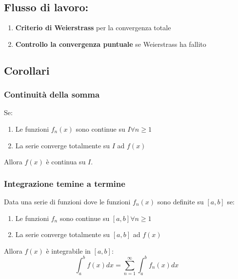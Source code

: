 \documentclass[10pt, a4paper]{article}
\begin{document}
    \subsection{Flusso di lavoro:}
    \begin{enumerate}
        \item \textbf{Criterio di Weierstrass} per la convergenza totale
        \item \textbf{Controllo la convergenza puntuale} se Weierstrass ha fallito
    \end{enumerate}
    \subsection{Corollari}
        \subsubsection{Continuità della somma}
            Se:
            \begin{enumerate}
                \item Le funzioni $f_n(x)$ sono continue su $I\forall n\geq 1$
                \item La serie converge totalmente su $I$ ad $f(x)$  
            \end{enumerate}
            Allora $f(x)$ è continua su $I$.
        \subsubsection{Integrazione temine a termine}
            Data una serie di funzioni dove le funzioni $f_n(x)$ sono definite su $[a,b]$ se:
            \begin{enumerate}
                \item Le funzioni $f_n$ sono continue su $[a,b]\forall n\geq 1$
                \item La serie converge totalmente su $[a,b]$ ad $f(x)$
            \end{enumerate}
            Allora $f(x)$ è integrabile in $[a,b]$:
            \begin{equation*}
                \int_{a}^{b}f(x)dx = \sum_{n=1}^{\infty}\int_{a}^{b}f_n(x)dx
            \end{equation*}
\end{document}
